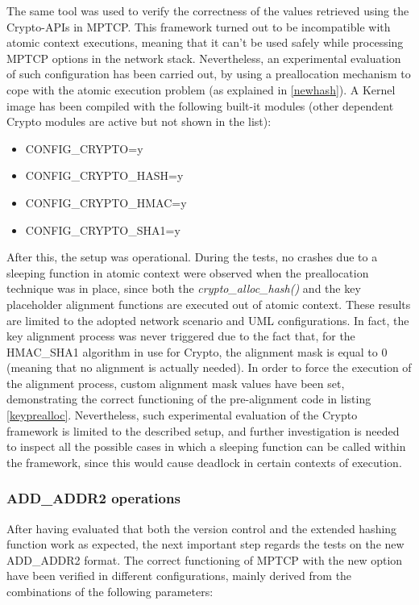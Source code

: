 The same tool was used to verify the correctness of the values retrieved using the Crypto-APIs in MPTCP. This framework turned out to be incompatible with atomic context executions, meaning that it can't be used safely while processing MPTCP options in the network stack. Nevertheless, an experimental evaluation of such configuration has been carried out, by using a preallocation mechanism to cope with the atomic execution problem (as explained in \ref{newhash}).
A Kernel image has been compiled with the following built-it modules (other dependent Crypto modules are active but not shown in the list):
\begin{itemize}
  \item CONFIG\_CRYPTO=y
  \item CONFIG\_CRYPTO\_HASH=y
  \item CONFIG\_CRYPTO\_HMAC=y
  \item CONFIG\_CRYPTO\_SHA1=y
\end{itemize}
After this, the setup was operational. During the tests, no crashes due to a sleeping function in atomic context were observed when the preallocation technique was in place, since both the \textit{crypto\_alloc\_hash()} and the key placeholder alignment functions are executed out of atomic context. These results are limited to the adopted network scenario and UML configurations. In fact, the key alignment process was never triggered due to the fact that, for the HMAC\_SHA1 algorithm in use for Crypto, the alignment mask is equal to 0 (meaning that no alignment is actually needed). In order to force the execution of the alignment process, custom alignment mask values have been set, demonstrating the correct functioning of the pre-alignment code in listing \ref{keyprealloc}. Nevertheless, such experimental evaluation of the Crypto framework is limited to the described setup, and further investigation is needed to inspect all the possible cases in which a sleeping function can be called within the framework, since this would cause deadlock in certain contexts of execution.

\subsubsection{ADD\_ADDR2 operations}
After having evaluated that both the version control and the extended hashing function work as expected, the next important step regards the tests on the new ADD\_ADDR2 format. The correct functioning of MPTCP with the new option have been verified in different configurations, mainly derived from the combinations of the following parameters:

